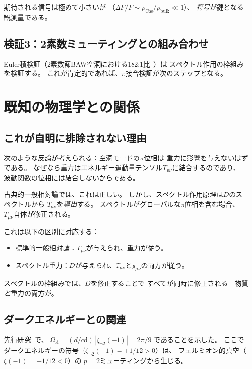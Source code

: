 \documentclass[11pt,a4paper,twocolumn]{article}
\begin{document}
期待される信号は極めて小さいが
（$\Delta F / F \sim \rho_{\mathrm{Cas}} / \rho_{\mathrm{bulk}} \ll 1$）、
\emph{符号}が鍵となる観測量である。

\subsection{検証3：2素数ミューティングとの組み合わせ}

Euler積検証（2素数篩BAW空洞における182:1比~\cite{WB_spectral_warp}）は
スペクトル作用の枠組みを検証する。
これが肯定的であれば、$\pi$接合検証が次のステップとなる。

\section{既知の物理学との関係}

\subsection{これが自明に排除されない理由}

次のような反論が考えられる：空洞モードの$\pi$位相は
重力に影響を与えないはずである。
なぜなら重力はエネルギー運動量テンソル$T_{\mu\nu}$に結合するのであり、
波動関数の位相には結合しないからである。

古典的一般相対論では、これは正しい。
しかし、スペクトル作用原理は$D$のスペクトルから
$T_{\mu\nu}$を\emph{導出}する。
スペクトルがグローバルな$\pi$位相を含む場合、
$T_{\mu\nu}$自体が修正される。

これは以下の区別に対応する：
\begin{itemize}
\item 標準的一般相対論：$T_{\mu\nu}$が与えられ、重力が従う。
\item スペクトル重力：$D$が与えられ、$T_{\mu\nu}$と$g_{\mu\nu}$の両方が従う。
\end{itemize}

スペクトルの枠組みでは、$D$を修正することで
すべてが同時に修正される---物質\emph{と}重力の両方が。

\subsection{ダークエネルギーとの関連}

先行研究~\cite{WB_arithmetic_universe}で、
$\Omega_\Lambda = (d/\mathrm{cd})\,|\xi_{\neg 2}(-1)| = 2\pi/9$
であることを示した。
ここでダークエネルギーの符号（$\zeta_{\neg 2}(-1) = +1/12 > 0$）は、
フェルミオン的真空（$\zeta(-1) = -1/12 < 0$）の
$p = 2$ミューティングから生じる。
\end{document}
